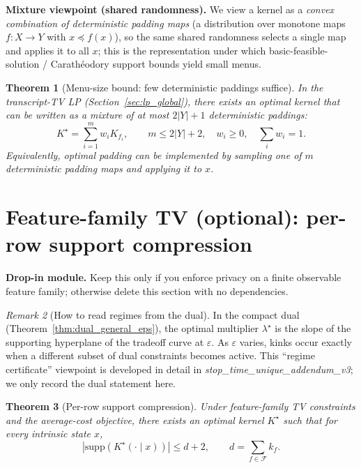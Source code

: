 \documentclass[11pt]{article}
\newtheorem{theorem}{Theorem}
\theoremstyle{definition}
\theoremstyle{remark}
\newtheorem{remark}[theorem]{Remark}
\begin{document}
\noindent\textbf{Mixture viewpoint (shared randomness).}
We view a kernel as a \emph{convex combination of deterministic padding maps} (a distribution over monotone maps $f:X\to Y$ with $x\preceq f(x)$),
so the same shared randomness selects a single map and applies it to all $x$; this is the representation under which basic-feasible-solution / Carathéodory support bounds yield small menus.

\begin{theorem}[Menu-size bound: few deterministic paddings suffice]\label{thm:menu_size_det}
In the transcript-TV LP (Section~\ref{sec:lp_global}), there exists an optimal kernel that can be written as a mixture of at most \(2|Y|+1\) deterministic paddings:
\[
K^\star=\sum_{i=1}^m w_i K_{f_i},\qquad m\le 2|Y|+2,\quad w_i\ge 0,\quad \sum_i w_i=1.
\]
Equivalently, optimal padding can be implemented by sampling one of \(m\) deterministic padding maps and applying it to \(x\).
\end{theorem}

\section{Feature-family TV (optional): per-row support compression}
\noindent\textbf{Drop-in module.} Keep this only if you enforce privacy on a finite observable feature family; otherwise delete this section with no dependencies.


\begin{remark}[How to read regimes from the dual]
In the compact dual (Theorem~\ref{thm:dual_general_eps}), the optimal multiplier $\lambda^\star$ is the slope of the supporting hyperplane of the tradeoff curve at $\varepsilon$.
As $\varepsilon$ varies, kinks occur exactly when a different subset of dual constraints becomes active.
This ``regime certificate'' viewpoint is developed in detail in \emph{stop\_time\_unique\_addendum\_v3}; we only record the dual statement here.
\end{remark}

\begin{theorem}[Per-row support compression]\label{thm:caratheodory}
Under feature-family TV constraints and the average-cost objective, there exists an optimal kernel $K^\star$ such that for every intrinsic state $x$,
\[
|\mathrm{supp}(K^\star(\cdot\mid x))|\le d+2,\qquad d=\sum_{f\in\mathcal{F}} k_f.
\]
\end{theorem}
\end{document}
